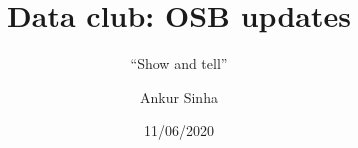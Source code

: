 
\usepackage{color}
\usepackage{tipa}
\usepackage[scale=2]{ccicons}
\usepackage{amssymb}
\usepackage{tikz}
\usetikzlibrary{mindmap, arrows.meta, positioning, arrows}
\usepackage{pgfplots}
\usepackage{jneurosci}
\usepackage{subcaption}
\usepackage[T1]{fontenc}
\usepackage[utf8]{inputenc}
\usepackage[style=nature,backend=biber,autocite=footnote]{biblatex}
% 
\usepackage[sfdefault]{roboto}
\usepackage[normalem]{ulem}
\usepackage{hyperref}
\hypersetup{colorlinks,linkcolor=Green,urlcolor=links}
\usepackage{graphicx}
\usepackage{algorithmic}
\usepackage{textcomp}
\usepackage{wrapfig}
\usepackage{textgreek}
\usepackage{euler}
\usepackage{csquotes}
\usepackage{tabularx}
\usepackage{booktabs}


\renewcommand{\footnoterule}{}

\title{Data club: OSB updates}
\subtitle{\enquote{Show and tell}}
\author[Ankur Sinha]{Ankur Sinha}
\date{11/06/2020}





